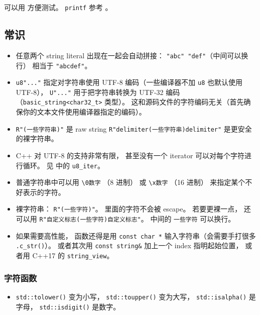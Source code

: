 
可以用  方便测试。 \verb`printf` 参考 。

\subsection{常识}
\begin{itemize}
\item 任意两个 string literal 出现在一起会自动拼接： \verb`"abc" "def"`（中间可以换行） 相当于 \verb`"abcdef"`。
\item \verb`u8"..."` 指定对字符串使用 UTF-8 编码（一些编译器不加 \verb`u8` 也默认使用 UTF-8）， \verb`U"..."` 用于把字符串转换为 UTF-32 编码（\verb`basic_string<char32_t>` 类型）。 这和源码文件的字符编码无关（首先确保你的文本文件使用编译器指定的编码）。
\item \verb`R"(一些字符串)"` 是 raw string \verb`R"delimiter(一些字符串)delimiter"` 是更安全的裸字符串。
\item C++ 对 UTF-8 的支持非常有限， 甚至没有一个 iterator 可以对每个字符进行循环。 见  中的 \verb`u8_iter`。
\item 普通字符串中可以用 \verb`\0数字` （8 进制） 或 \verb`\x数字` （16 进制） 来指定某个不好表示的字符。
\item 裸字符串： \verb`R"(一些字符)"`。 里面的字符不会被 escape。 若要更裸一点， 还可以用 \verb`R"自定义标志(一些字符)自定义标志"`。 中间的 \verb`一些字符` 可以换行。
\item 如果需要高性能， 函数还得是用 \verb`const char *` 输入字符串（会需要手打很多 \verb`.c_str()`）。 或者其次用 \verb`const string&` 加上一个 index 指明起始位置， 或者用 C++17 的 \verb`string_view`。
\end{itemize}

\subsubsection{字符函数}
\begin{itemize}
\item \verb`std::tolower()` 变为小写， \verb`std::toupper()` 变为大写， \verb`std::isalpha()` 是字母， \verb`std::isdigit()` 是数字。
\end{itemize}


